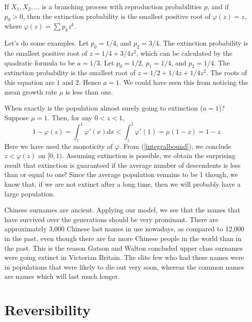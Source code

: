 \begin{theorem}
    If $X_1, X_2, \dots$ is a branching process with reproduction probabilities $p$, and if $p_0 > 0$, then the extinction probability is the smallest positive root of $\varphi(z) = z$, where $\varphi(z) = \sum p_k z^k$.
\end{theorem}

Let's do some examples. Let $p_0 = 1/4$, and $p_2 = 3/4$. The extinction probability is the smallest positive root of $z = 1/4 + 3/4z^2$, which can be calculated by the quadratic formula to be $a = 1/3$. Let $p_0 = 1/2$, $p_1 = 1/4$, and $p_2 = 1/4$. The extinction probability is the smallest root of $z = 1/2 + 1/4 z + 1/4 z^2$. The roots of this equation are $1$ and $2$. Hence $a = 1$. We could have seen this from noticing the mean growth rate $\mu$ is less than one.

When exactly is the population almost surely going to extinction ($a = 1$)? Suppose $\mu = 1$. Then, for any $0 < z < 1$,
%
\begin{equation} \label{integralbound} 1 - \varphi(z) = \int_z^1 \varphi'(x) dx < \int_z^1 \varphi'(1) = \mu(1 - z) = 1 - z \end{equation}
%
Here we have used the monoticity of $\varphi$. From (\ref{integralbound}), we conclude $z < \varphi(z)$ on $[0,1)$. Assuming extinction is possible, we obtain the surprising result that extinction is guaranteed if the average number of descendents is less than or equal to one! Since the average population remains to be 1 though, we know that, if we are not extinct after a long time, then we will probably have a large population.

Chinese surnames are ancient. Applying our model, we see that the names that have survived over the generations should be very prominant. There are approximately 3,000 Chinese last names in use nowadays, as compared to 12,000 in the past, even though there are far more Chinese people in the world than in the past. This is the reason Gatson and Walton concluded upper class surnames were going extinct in Victorian Britain. The elite few who had these names were in populations that were likely to die out very soon, whereas the common names are names which will last much longer.

\section{Reversibility}

